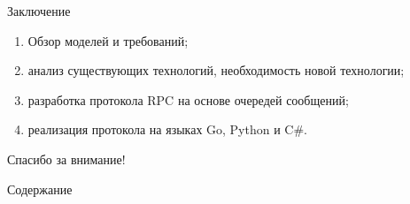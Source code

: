 \documentclass[xetex,mathserif,serif,10pt]{beamer}
\begin{document}
    \begin{frame}{Заключение}
        \begin{enumerate}
            \item Обзор моделей и требований;
            \item анализ существующих технологий,
                необходимость новой технологии;
            \item разработка протокола RPC на основе очередей сообщений;
            \item реализация протокола на языках Go, Python и C\#.
        \end{enumerate}
    \end{frame}

    \begin{frame}
        \Large\centering Спасибо за внимание!
    \end{frame}

    \begin{frame}{Содержание}
        \tableofcontents
    \end{frame}
\end{document}
